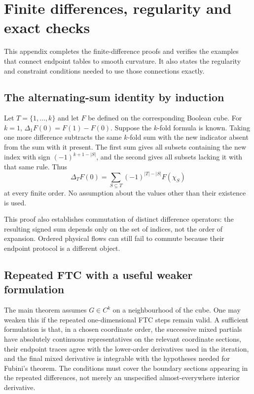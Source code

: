 \chapter{Finite differences, regularity and exact checks}\label{app:calculus}

This appendix completes the finite-difference proofs and verifies the examples that connect endpoint tables to smooth curvature. It also states the regularity and constraint conditions needed to use those connections exactly.

\section{The alternating-sum identity by induction}
Let $T=\{1,\ldots,k\}$ and let $F$ be defined on the corresponding Boolean cube. For $k=1$, $\Delta_1F(0)=F(1)-F(0)$. Suppose the $k$-fold formula is known. Taking one more difference subtracts the same $k$-fold sum with the new indicator absent from the sum with it present. The first sum gives all subsets containing the new index with sign $(-1)^{k+1-|S|}$, and the second gives all subsets lacking it with that same rule. Thus
\begin{equation}
 \Delta_TF(0)=\sum_{S\subseteq T}(-1)^{|T|-|S|}F(\chi_S)
\end{equation}
at every finite order. No assumption about the values other than their existence is used.

This proof also establishes commutation of distinct difference operators: the resulting signed sum depends only on the set of indices, not the order of expansion. Ordered physical flows can still fail to commute because their endpoint protocol is a different object.

\section{Repeated FTC with a useful weaker formulation}
The main theorem assumes $G\in C^k$ on a neighbourhood of the cube. One may weaken this if the repeated one-dimensional FTC steps remain valid. A sufficient formulation is that, in a chosen coordinate order, the successive mixed partials have absolutely continuous representatives on the relevant coordinate sections, their endpoint traces agree with the lower-order derivatives used in the iteration, and the final mixed derivative is integrable with the hypotheses needed for Fubini's theorem. The conditions must cover the boundary sections appearing in the repeated differences, not merely an unspecified almost-everywhere interior derivative.

